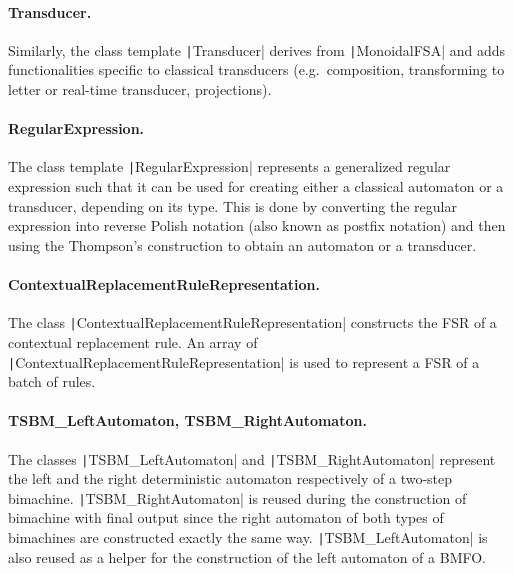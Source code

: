 \documentclass{article}
\begin{document}
	\paragraph{Transducer.} Similarly, the class template \texttt|Transducer| derives from \texttt|MonoidalFSA| and adds functionalities specific to classical transducers (e.g.\ composition, transforming to letter or real-time transducer, projections).
	
	\paragraph{RegularExpression.} The class template \texttt|RegularExpression| represents a generalized regular expression such that it can be used for creating either a classical automaton or a transducer, depending on its type.
	This is done by converting the regular expression into reverse Polish notation (also known as postfix notation) and then using the Thompson's construction to obtain an automaton or a transducer.

	\paragraph{ContextualReplacementRuleRepresentation.} The class \texttt|ContextualReplacementRuleRepresentation| constructs the FSR of a contextual replacement rule. An array of \texttt|ContextualReplacementRuleRepresentation| is used to represent a FSR of a batch of rules.

	\paragraph{TSBM\_LeftAutomaton, TSBM\_RightAutomaton.} The classes \texttt|TSBM_LeftAutomaton| and \texttt|TSBM_RightAutomaton| represent the left and the right deterministic automaton respectively of a two-step bimachine. \texttt|TSBM_RightAutomaton| is reused during the construction of bimachine with final output since the right automaton of both types of bimachines are constructed exactly the same way. \texttt|TSBM_LeftAutomaton| is also reused as a helper for the construction of the left automaton of a BMFO.
	
\end{document}
